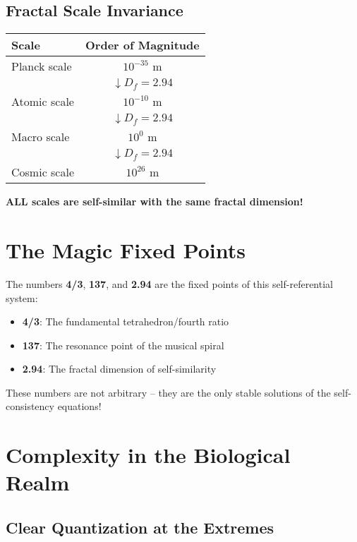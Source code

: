 \documentclass[12pt,a4paper]{article}
\newcommand{\Df}{D_f}
\begin{document}
	\subsection{Fractal Scale Invariance}
	
	\begin{center}
		\begin{tabular}{lc}
			\toprule
			Scale & Order of Magnitude\\
			\midrule
			Planck scale & $10^{-35}$ m\\
			& $\downarrow \Df = 2.94$\\
			Atomic scale & $10^{-10}$ m\\
			& $\downarrow \Df = 2.94$\\
			Macro scale & $10^0$ m\\
			& $\downarrow \Df = 2.94$\\
			Cosmic scale & $10^{26}$ m\\
			\bottomrule
		\end{tabular}
	\end{center}
	
	\textbf{ALL scales are self-similar with the same fractal dimension!}
	
	\section{The Magic Fixed Points}
	
	The numbers \textbf{4/3}, \textbf{137}, and \textbf{2.94} are the fixed points of this self-referential system:
	
	\begin{itemize}
		\item \textbf{4/3}: The fundamental tetrahedron/fourth ratio
		\item \textbf{137}: The resonance point of the musical spiral
		\item \textbf{2.94}: The fractal dimension of self-similarity
	\end{itemize}
	
	These numbers are not arbitrary -- they are the only stable solutions of the self-consistency equations!
	
	\section{Complexity in the Biological Realm}
	
	\subsection{Clear Quantization at the Extremes}
	
\end{document}

